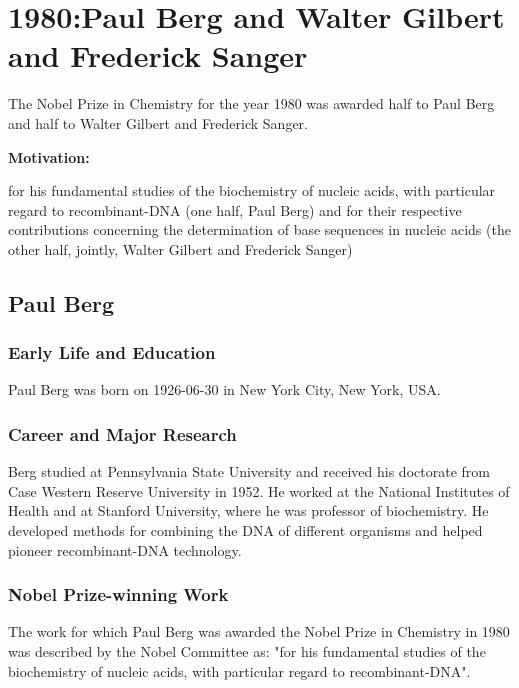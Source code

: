 \chapter{1980:Paul Berg and Walter Gilbert and Frederick Sanger}

\label{chap:chemistry1980}

The Nobel Prize in Chemistry for the year 1980 was awarded half to Paul Berg and half to Walter Gilbert and Frederick Sanger.

\textbf{Motivation:}

for his fundamental studies of the biochemistry of nucleic acids, with particular regard to recombinant-DNA (one half, Paul Berg) and for their respective contributions concerning the determination of base sequences in nucleic acids (the other half, jointly, Walter Gilbert and Frederick Sanger)

\section{Paul Berg}

\subsection*{Early Life and Education}

Paul Berg was born on 1926-06-30 in New York City, New York, USA.

\subsection*{Career and Major Research}

Berg studied at Pennsylvania State University and received his doctorate from Case Western Reserve University in 1952. He worked at the National Institutes of Health and at Stanford University, where he was professor of biochemistry. He developed methods for combining the DNA of different organisms and helped pioneer recombinant-DNA technology.

\subsection*{Nobel Prize-winning Work}

The work for which Paul Berg was awarded the Nobel Prize in Chemistry in 1980 was described by the Nobel Committee as: "for his fundamental studies of the biochemistry of nucleic acids, with particular regard to recombinant-DNA".

